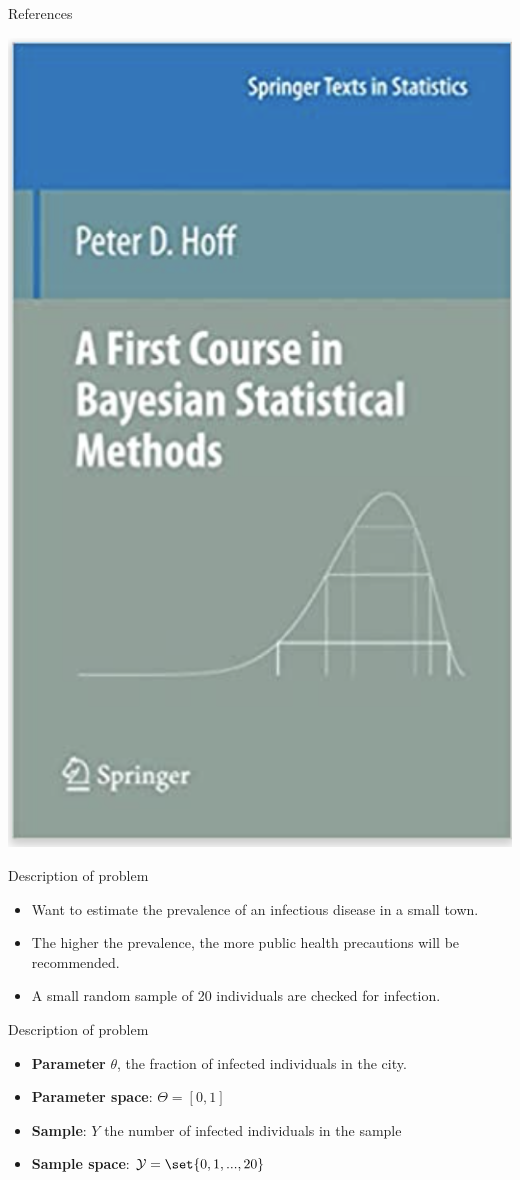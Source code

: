 \documentclass[10pt]{beamer}
\begin{document}
\begin{frame}{References}

\begin{center}
\includegraphics[width=.5\textwidth]{images/hoff_book}
\end{center}

\end{frame}

\begin{frame}{Description of problem}

\begin{itemize}
\item Want to estimate the prevalence of an infectious disease in a small town.
\item The higher the prevalence,  the more public health precautions will be recommended.
\item A small random sample of 20 individuals are checked for infection.
\end{itemize}
\end{frame}

\begin{frame}{Description of problem}

\begin{itemize}
\item \textbf{Parameter} $\theta$,  the fraction of infected individuals in the city.
\item \textbf{Parameter space}:  $\Theta = [0,1]$
\item \textbf{Sample}: $Y$ the number of infected individuals in the sample
\item \textbf{Sample space}: $\mathcal{Y} = \set{0,1,...,20}$
\end{itemize}

\end{frame}
\end{document}
